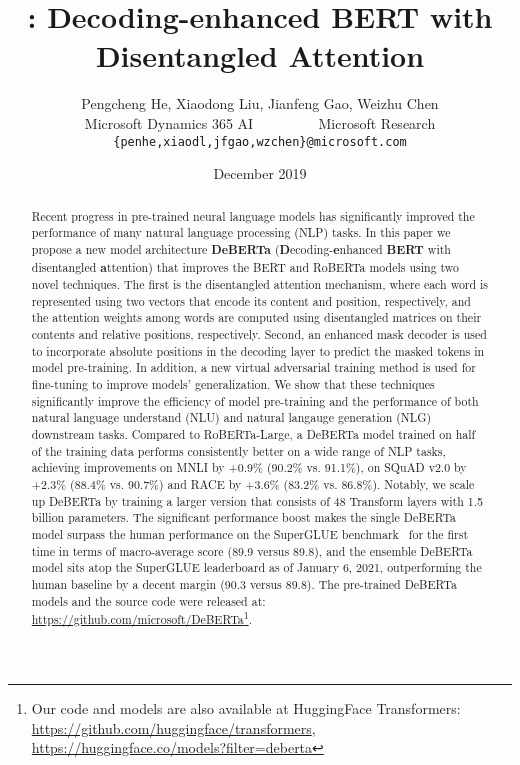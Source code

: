 \documentclass{article}
\title{\ModelName: Decoding-enhanced BERT with Disentangled Attention}
\author{Pengcheng He, Xiaodong Liu, Jianfeng Gao,  Weizhu Chen \\
     Microsoft Dynamics 365 AI  ~~~~~~~~   Microsoft Research \\
  {\tt \{penhe,xiaodl,jfgao,wzchen\}@microsoft.com}
}
\date{December 2019}
\begin{document}
\maketitle

\begin{abstract}
Recent progress in pre-trained neural language models has significantly improved the performance of many natural language processing (NLP) tasks. In this paper we propose a new model architecture \textbf{DeBERTa}
(\textbf{D}ecoding-\textbf{e}nhanced \textbf{BERT} with disentangled \textbf{a}ttention) 
that improves the BERT and RoBERTa models using two novel techniques.
The first is the disentangled attention mechanism, where each word is represented using two vectors that encode its content and position, respectively, and the attention weights among words are computed using disentangled matrices on their contents and relative positions, respectively.
Second, 
an enhanced mask decoder is used to incorporate absolute positions in the decoding layer to predict the masked tokens in model pre-training.
In addition, a new virtual adversarial training method is used for fine-tuning to improve models' generalization.  
We show that these techniques significantly improve the efficiency of model pre-training and the performance of both natural language understand (NLU) and natural langauge generation (NLG) downstream tasks. 
Compared to RoBERTa-Large, a DeBERTa model 
trained on half of the training data
performs consistently better on a wide range of NLP tasks, 
achieving improvements on MNLI by +0.9\% (90.2\% vs. 91.1\%), on SQuAD v2.0 by +2.3\% (88.4\% vs. 90.7\%) and RACE by +3.6\% (83.2\% vs. 86.8\%). 
Notably, we scale up DeBERTa by training a larger version that consists of 48 Transform layers with 1.5 billion parameters. 
The significant performance boost makes the single DeBERTa model surpass the human performance on the SuperGLUE benchmark~\citep{wang2019superglue} for the first time in terms of macro-average score (89.9 versus 89.8), and the ensemble DeBERTa model sits atop the SuperGLUE leaderboard as of January 6, 2021, outperforming the human baseline by a decent margin (90.3 versus 89.8). The pre-trained DeBERTa models and the source code were released at: \url{https://github.com/microsoft/DeBERTa}\footnote{Our code and models are also available at HuggingFace Transformers: \url{https://github.com/huggingface/transformers}, \url{https://huggingface.co/models?filter=deberta} }.






\end{abstract}
\end{document}

